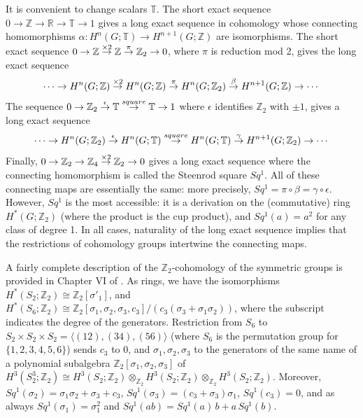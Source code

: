 \documentclass[12pt]{article}
\numberwithin{equation}{section}
\def\bbR           {\mathbb{R}}
\def\bbT           {\mathbb{T}}
\def\bbZ           {\mathbb{Z}}
\begin{document}
It is convenient to change scalars $\bbT$. The short exact sequence $0\rightarrow\bbZ\rightarrow\bbR\rightarrow\bbT\rightarrow 1$ gives a long exact sequence
in cohomology whose connecting homomorphisms $\alpha:H^n(G;\bbT)\rightarrow H^{n+1}(G;\bbZ)$ are isomorphisms.
The short exact sequence $0\rightarrow \bbZ\buildrel \times 2\over \rightarrow \bbZ\buildrel\pi\over\rightarrow\bbZ_2\rightarrow 0$, where $\pi$ is reduction mod 2, gives the long exact sequence
\begin{equation}\label{longbeta}\cdots \rightarrow H^n(G;\bbZ)\buildrel \times 2\over \rightarrow H^n(G;\bbZ)\buildrel\pi\over\rightarrow H^n(G;\bbZ_2)\buildrel\beta\over\rightarrow H^{n+1}(G;\bbZ)\rightarrow\cdots\end{equation}
The sequence $0\rightarrow\bbZ_2\buildrel \epsilon\over \rightarrow\bbT\buildrel square\over \rightarrow\bbT\rightarrow 1$ where $\epsilon$ identifies $\bbZ_2$ with $\pm 1$, gives a long exact sequence 
\begin{equation}\label{longgamma}\cdots \rightarrow H^n(G;\bbZ_2)\buildrel \epsilon\over \rightarrow H^n(G;\bbT)\buildrel square\over\rightarrow H^n(G;\bbT)\buildrel\gamma\over\rightarrow H^{n+1}(G;\bbZ_2)\rightarrow\cdots\end{equation}
Finally, $0\rightarrow \bbZ_2\rightarrow\bbZ_4\buildrel\times 2\over \rightarrow\bbZ_2\rightarrow 0$ gives
a long exact sequence where the connecting homomorphism is called the Steenrod square $Sq^1$. All of these connecting maps are essentially the same: more precisely, $Sq^1=\pi\circ\beta=\gamma\circ\epsilon$. However,  $Sq^1$ is the most accessible: it is a derivation on the (commutative) ring $H^*(G;\bbZ_2)$ (where the product is the cup product), and $Sq^1(a)=a^2$ for any class of degree 1. In all cases, naturality of the long exact sequence implies that the restrictions
of cohomology groups intertwine the connecting maps.




A fairly complete description of the $\bbZ_2$-cohomology of the symmetric groups is provided in Chapter VI of \cite{AM}. As rings, we have the isomorphisms $H^*(S_2;\bbZ_2)\cong\bbZ_2[\sigma'_1]$, 
and $H^*(S_6;\bbZ_2)\cong \bbZ_2[\sigma_1,\sigma_2,\sigma_3,c_3]/(c_3(\sigma_3+\sigma_1\sigma_2))$, where the subscript indicates the degree of the generators. Restriction from
$S_6$ to $S_2\times S_2\times S_2=\langle (12),(34),(56)\rangle$ (where $S_6$ is the permutation group for $\{1,2,3,4,5,6\}$) sends $c_3$ to 0, and $\sigma_1,\sigma_2,\sigma_3$ to the generators of the same name of
a polynomial subalgebra $\bbZ_2[\sigma_1,\sigma_2,\sigma_3]$ of $H^3(S_2^3;\bbZ_2)\cong H^3(S_2;\bbZ_2)\otimes_{\bbZ_2} H^3(S_2;\bbZ_2)\otimes_{\bbZ_2} H^3(S_2;\bbZ_2)$. Moreover,   $Sq^1(\sigma_2)=
\sigma_1\sigma_2+\sigma_3+c_3$, $Sq^1(\sigma_3)=(c_3+\sigma_3)\sigma_1$, $Sq^1(c_3)=0$, and as always $Sq^1(\sigma_1)=\sigma_1^2$ and $Sq^1(ab)=Sq^1(a)\,b+a\,Sq^1(b)$. 
 
\end{document}
